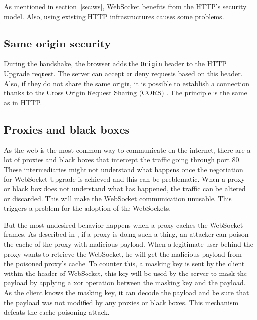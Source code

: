 \documentclass[10pt,journal,compsoc]{IEEEtran}
\newcommand{\ttt}[1]{\texttt{#1}}
\newcommand{\ws}{WebSocket}
\begin{document}
As mentioned in section~\ref{sec:ws}, \ws{} benefits from the HTTP's security model. Also, using existing HTTP infrastructures causes some problems. %

\subsection{Same origin security}

During the handshake, the browser adds the \ttt{Origin} header to the HTTP Upgrade request.
The server can accept or deny requests based on this header. %
Also, if they do not share the same origin, it is possible to establish a connection thanks to the Cross Origin Request Sharing (CORS) \cite{talkingtoyourself}. %
The principle is the same as in HTTP.

\subsection{Proxies and black boxes}
\label{sec:key}
As the web is the most common way to communicate on the internet, there are a lot of proxies and black boxes that intercept the traffic going through port 80. %
These intermediaries might not understand what happens once the negotiation for \ws{} Upgrade is achieved and this can be problematic. %
When a proxy or black box does not understand what has happened, the traffic can be altered or discarded. %
This will make the \ws{} communication unusable.
This triggers a problem for the adoption of the \ws s.  %

But the most undesired behavior happens when a proxy caches the \ws{} frames.
As described in \cite{talkingtoyourself}, if a proxy is doing such a thing, an attacker can poison the cache of the proxy with malicious payload. %
When a legitimate user behind the proxy wants to retrieve the \ws{}, he will get the malicious payload from the poisoned proxy's cache.
To counter this, a masking key is sent by the client within the header of \ws{}, this key will be used by the server to mask the payload by applying a xor operation between the masking key and the payload.
As the client knows the masking key, it can decode the payload and be sure that the payload was not modified by any proxies or black boxes.
This mechanism defeats the cache poisoning attack.
\end{document}
